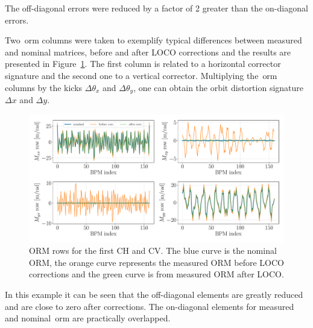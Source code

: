 The off-diagonal errors were reduced by a factor of 2 greater than the on-diagonal errors.

Two~\gls{orm} columns were taken to exemplify typical differences between measured and nominal matrices, before and after LOCO corrections and the results are presented in Figure~\ref{fig:orm_rows}. The first column is related to a horizontal corrector signature and the second one to a vertical corrector. Multiplying the~\gls{orm} columns by the kicks $\Delta\theta_x$ and $\Delta\theta_y$, one can obtain the orbit distortion signature $\Delta x$ and $\Delta y$.
\begin{figure}
\centering
\includegraphics[width=1.0\textwidth]{figures/nominal_measured_after_before_loco_big.pdf}
\caption{ORM rows for the first CH and CV. The blue curve is the nominal ORM, the orange curve represents the measured ORM before LOCO corrections and the green curve is from measured ORM after LOCO.}
\label{fig:orm_rows}
\end{figure}

In this example it can be seen that the off-diagonal elements are greatly reduced and are close to zero after corrections. The on-diagonal elements for measured and nominal~\gls{orm} are practically overlapped.

